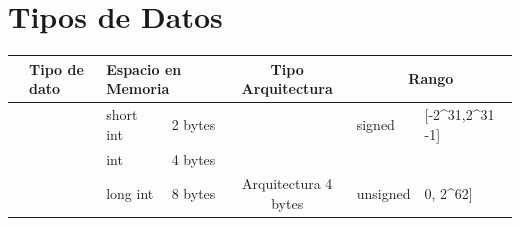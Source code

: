 \documentclass{article}
\begin{document}
\newpage
\section{Tipos de Datos}
\begin{table}[H]
    \begin{tabular}{|l|lll|c|ll|}
    \hline
    \rowcolor[HTML]{C0C0C0} 
                                                      & \multicolumn{1}{l|}{\cellcolor[HTML]{C0C0C0}Tipo de dato}             & \multicolumn{2}{l|}{\cellcolor[HTML]{C0C0C0}Espacio en Memoria} & Tipo Arquitectura                                                                   & \multicolumn{2}{c|}{\cellcolor[HTML]{C0C0C0}Rango}                                                                            \\ \hline
    \rowcolor[HTML]{EBD178} 
    \cellcolor[HTML]{C0C0C0}                          & \multicolumn{1}{c|}{\cellcolor[HTML]{EBD178}}                         & short int                        & 2 bytes                      & \cellcolor[HTML]{EBD178}                                                            & signed                                             & {[}-2\textasciicircum{}31,2\textasciicircum{}31 -1{]}                    \\ \cline{3-4} \cline{6-7} 
    \rowcolor[HTML]{EBD178} 
    \cellcolor[HTML]{C0C0C0}                          & \multicolumn{1}{c|}{\cellcolor[HTML]{EBD178}}                         & int                              & 4 bytes                      & \cellcolor[HTML]{EBD178}                                                            & \cellcolor[HTML]{EBD178}                           & \cellcolor[HTML]{EBD178}                                                 \\ \cline{3-4}
    \rowcolor[HTML]{EBD178} 
    \cellcolor[HTML]{C0C0C0}                          & \multicolumn{1}{c|}{\cellcolor[HTML]{EBD178}}                         & long int                         & 8 bytes                      & \multirow{-3}{*}{\cellcolor[HTML]{EBD178}Arquitectura 4 bytes}                      & \multirow{-2}{*}{\cellcolor[HTML]{EBD178}unsigned} & \multirow{-2}{*}{\cellcolor[HTML]{EBD178}{[}0, 2\textasciicircum{}62{]}} \\ \cline{3-7} 

\end{tabular}
\end{table}
\end{document}
